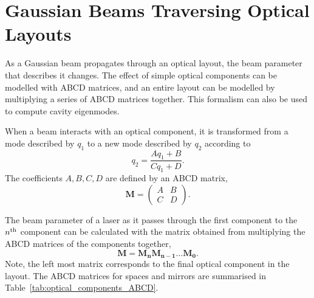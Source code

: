 \section{Gaussian Beams Traversing Optical Layouts}
\label{sec:gaussian_beam_tracing}
As a Gaussian beam propagates through an optical layout, the beam parameter that describes it changes. The effect of simple optical components can be modelled with ABCD matrices, and an entire layout can be modelled by multiplying a series of ABCD matrices together. This formalism can also be used to compute cavity eigenmodes.
\par
When a beam interacts with an optical component, it is transformed from a mode described by $q_1$ to a new mode described by $q_2$ according to 
\begin{equation}
q_2 = \frac{A q_1 +B}{C q_1 + D}.
\end{equation}
The coefficients $A,B,C,D$ are defined by an ABCD matrix,
\begin{equation}
\mathbf{M} = \begin{pmatrix} A &B\\	C &D \end{pmatrix}.
\end{equation}
\par
The beam parameter of a laser as it passes through the first component to the $n^{\rm{th}}$ component can be calculated with the matrix obtained from multiplying the ABCD matrices of the components together,
\begin{equation}
\mathbf{M} = \mathbf{M_n}\mathbf{M_{n-1}}\ldots\mathbf{M_0}.
\end{equation}
Note, the left most matrix corresponds to the final optical component in the layout. The ABCD matrices for spaces and mirrors are summarised in Table~\ref{tab:optical_components_ABCD}.
